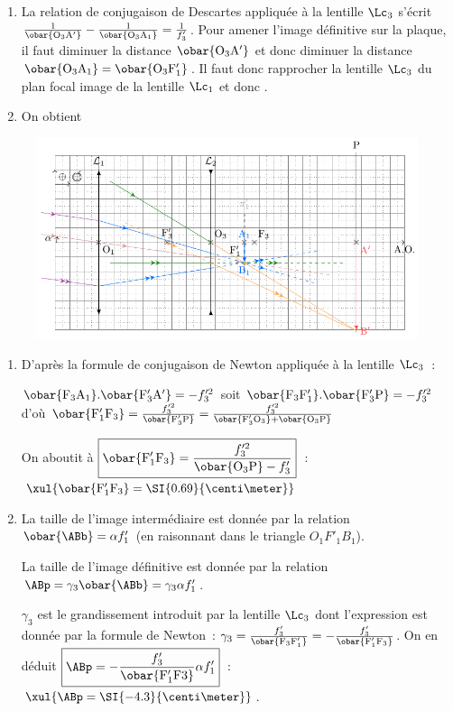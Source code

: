 \documentclass[a4paper, 11pt, garamond, oneside]{book}
\begin{document}
{\begin{enumerate}
		\item La relation de conjugaison de Descartes appliquée à la lentille
		      $\Lc_3$ s'écrit $\frac{1}{\obar{\rm O_3A'}} - \frac{1}{\obar{\rm O_3A_1}}
			      = \frac{1}{f'_3}$. Pour amener l'image définitive sur la plaque, il faut
		      diminuer la distance $\obar{\rm O_3A'}$ et donc diminuer la distance
		      $\obar{\rm O_3A_1}=\obar{\rm O_3F'_1}$. Il faut donc rapprocher la
		      lentille $\Lc_3$ du plan focal image de la lentille $\Lc_1$ et donc
		      .
		\item On obtient
	\end{enumerate}
	\begin{figure}[htbp!]
		\centering
		\includegraphics[width=\linewidth]{teleobj}
	\end{figure}
	\begin{enumerate}
		\item D'après la formule de conjugaison de Newton appliquée à la lentille
		      $\Lc_3$~:

		      $\obar{\rm F_3A_1}.\obar{\rm F'_3A'} = - f'^2_3$ soit $\obar{\rm
				      F_3F'_1}.\obar{\rm F'_3P} = - f'^2_3$ d'où $\obar{\rm F'_1F_3} =
			      \frac{f'^2_3}{\obar{\rm F'_3P}} = \frac{f'^2_3}{\obar{\rm F'_3O_3} +
				      \obar{\rm O_3P}}$

		      On aboutit à $\boxed{\obar{\rm F'_1F_3} = \frac{f'^2_3}{\obar{\rm
						      O_3P} - f'_3}}$~: $\xul{\obar{\rm F'_1F_3} =
				      \SI{0.69}{\centi\meter}}$

		\item La taille de l'image intermédiaire est donnée par la relation
		      $\obar{\rm \ABb} = \alpha f'_1$ (en raisonnant dans le triangle
		      $O_1F'_1B_1$).

		      La taille de l'image définitive est donnée par la relation $\ABp =
			      \gamma_3 \obar{\rm \ABb} = \gamma_3 \alpha f'_1$.

		      $\gamma_3$ est le grandissement introduit par la lentille $\Lc_3$ dont
		      l'expression est donnée par la formule de Newton~: $\gamma_3 =
			      \frac{f'_3}{\obar{\rm F_3F'_1}} = - \frac{f'_3}{\obar{\rm F'_1F_3}}$.
		      On en déduit $\boxed{\ABp = - \frac{f'_3}{\obar{\rm F'_1F3}} \alpha
				      f'_1}$~: $\xul{\ABp = \SI{-4.3}{\centi\meter}}$.
	\end{enumerate}
}
\end{document}
